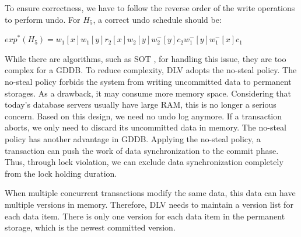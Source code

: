 \documentclass[conference]{IEEEtran}
\begin{document}
To ensure correctness, we have to follow the reverse order of the write operations to perform undo.
For ${H_5}$, a correct undo schedule should be:
\begin{center}
${exp^*(H_5) = w_1[x]w_1[y]r_2[x]w_2[y]w^-_2[y]c_2w^-_1[y]w^-_1[x]c_1}$
\end{center}

While there are algorithms, such as SOT \cite{UnifyCR:journals/is/AlonsoVABASW94}, for handling this issue, they are too complex for a GDDB.
To reduce complexity, DLV adopts the no-steal policy.
The no-steal policy forbids the system from writing uncommitted data to permanent storages.
As a drawback, it may consume more memory space.
Considering that today's database servers usually have large RAM, this is no longer a serious concern.
Based on this design, we need no undo log anymore. If a transaction aborts, we only need to discard its uncommitted data in memory.
The no-steal policy has another advantage in GDDB.
Applying the no-steal policy, a transaction can push the work of data synchronization to the commit phase.
Thus, through lock violation, we can exclude data synchronization completely from the lock holding duration.

When multiple concurrent transactions modify the same data, this data can have multiple versions in memory.
Therefore, DLV needs to maintain a version list for each data item.
There is only one version for each data item in the permanent storage, which is the newest committed version.
\end{document}
